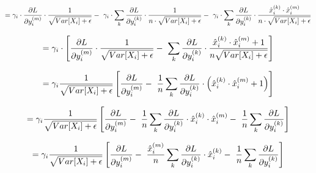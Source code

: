 \documentclass[]{article}
\newcommand{\deriv}[2]{%
	\ensuremath{\frac{\partial {#1}}{\partial {#2}}}}
\newcommand{\slayer}[3]{ %
	\ensuremath{{#1}^{(#2)}_{#3}}}
\begin{document}
$$= \gamma_i \cdot \deriv{L}{\slayer{y}{m}{i}} \cdot \frac{1}{\sqrt{Var[X_i] + \epsilon}} - \
\gamma_i \cdot \sum_k \deriv{L}{\slayer{y}{k}{i}} \cdot \frac{1}{n \cdot \sqrt{Var[X_i] + \epsilon}} - \
\gamma_i \cdot \sum_k \deriv{L}{\slayer{y}{k}{i}} \cdot \frac{\slayer{\hat{x}}{k}{i} \cdot \slayer{\hat{x}}{m}{i}}{n \cdot \sqrt{Var[X_i] + \epsilon}}$$

$$ = \gamma_i \cdot \left[ \deriv{L}{\slayer{y}{m}{i}} \cdot \frac{1}{\sqrt{Var[X_i] + \epsilon}} - \
 \sum_{k}\deriv{L}{\slayer{y}{k}{i}} \cdot \frac{\slayer{\hat{x}}{k}{i} \cdot \slayer{\hat{x}}{m}{i}+1}{n \sqrt{Var[X_i] + \epsilon}}\right]$$

$$ = \gamma_i \frac{1}{\sqrt{Var[X_i] + \epsilon}} \left[ \deriv{L}{\slayer{y}{m}{i}} - \
\frac{1}{n} \sum_{k}\deriv{L}{\slayer{y}{k}{i}} \cdot \left(\slayer{\hat{x}}{k}{i} \cdot \slayer{\hat{x}}{m}{i}+1 \right)\right]$$

$$ = \gamma_i \frac{1}{\sqrt{Var[X_i] + \epsilon}} \left[ \deriv{L}{\slayer{y}{m}{i}} - \
\frac{1}{n} \sum_{k}\deriv{L}{\slayer{y}{k}{i}} \cdot \slayer{\hat{x}}{k}{i} \cdot \slayer{\hat{x}}{m}{i} - \
\frac{1}{n} \sum_{k}\deriv{L}{\slayer{y}{k}{i}} \right]$$

$$ = \gamma_i \frac{1}{\sqrt{Var[X_i] + \epsilon}} \left[ \deriv{L}{\slayer{y}{m}{i}} - \
\frac{\slayer{\hat{x}}{m}{i}}{n} \sum_{k}\deriv{L}{\slayer{y}{k}{i}} \cdot \slayer{\hat{x}}{k}{i} - \
\frac{1}{n} \sum_{k}\deriv{L}{\slayer{y}{k}{i}} \right]$$
\end{document}
